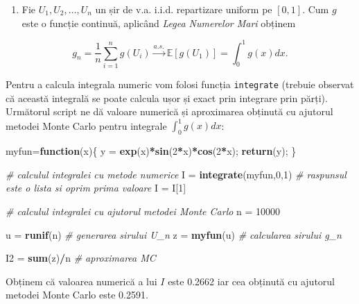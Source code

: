 \documentclass[]{article}
\newenvironment{Shaded}{\begin{snugshade}}{\end{snugshade}}
\newcommand{\CommentTok}[1]{\textcolor[rgb]{0.56,0.35,0.01}{\textit{#1}}}
\newcommand{\ControlFlowTok}[1]{\textcolor[rgb]{0.13,0.29,0.53}{\textbf{#1}}}
\newcommand{\DecValTok}[1]{\textcolor[rgb]{0.00,0.00,0.81}{#1}}
\newcommand{\KeywordTok}[1]{\textcolor[rgb]{0.13,0.29,0.53}{\textbf{#1}}}
\newcommand{\NormalTok}[1]{#1}
\newcommand{\OperatorTok}[1]{\textcolor[rgb]{0.81,0.36,0.00}{\textbf{#1}}}
\newcommand{\StringTok}[1]{\textcolor[rgb]{0.31,0.60,0.02}{#1}}
\providecommand{\tightlist}{%
  \setlength{\itemsep}{0pt}\setlength{\parskip}{0pt}}
\begin{document}
\begin{enumerate}
\def\labelenumi{\alph{enumi})}
\setcounter{enumi}{1}
\tightlist
\item
  Fie \(U_1,U_2,\dots,U_n\) un șir de v.a. i.i.d. repartizare uniform pe
  \([0,1]\). Cum \(g\) este o funcție continuă, aplicând \emph{Legea
  Numerelor Mari} obținem
\end{enumerate}

\[
  g_n=\frac{1}{n}\sum_{i=1}^{n}g(U_{i}) \overset{a.s.}{\to} \mathbb{E}[g(U_1)] = \int_{0}^{1}g(x)dx.
\]

Pentru a calcula integrala numeric vom folosi funcția \texttt{integrate}
(trebuie observat că această integrală se poate calcula ușor și exact
prin integrare prin părți). Următorul script ne dă valoare numerică și
aproximarea obținută cu ajutorul metodei Monte Carlo pentru integrale
\(\int_{0}^{1}g(x)dx\):

\begin{Shaded}
\begin{Highlighting}[]
\NormalTok{myfun=}\ControlFlowTok{function}\NormalTok{(x)\{}
\NormalTok{  y =}\StringTok{ }\KeywordTok{exp}\NormalTok{(x)}\OperatorTok{*}\KeywordTok{sin}\NormalTok{(}\DecValTok{2}\OperatorTok{*}\NormalTok{x)}\OperatorTok{*}\KeywordTok{cos}\NormalTok{(}\DecValTok{2}\OperatorTok{*}\NormalTok{x);}
  \KeywordTok{return}\NormalTok{(y);}
\NormalTok{\}}

\CommentTok{# calculul integralei cu metode numerice}
\NormalTok{I =}\StringTok{ }\KeywordTok{integrate}\NormalTok{(myfun,}\DecValTok{0}\NormalTok{,}\DecValTok{1}\NormalTok{) }\CommentTok{# raspunsul este o lista si oprim prima valoare}
\NormalTok{I =}\StringTok{ }\NormalTok{I[}\DecValTok{1}\NormalTok{]}

\CommentTok{# calculul integralei cu ajutorul metodei Monte Carlo}
\NormalTok{n =}\StringTok{ }\DecValTok{10000} 

\NormalTok{u =}\StringTok{ }\KeywordTok{runif}\NormalTok{(n) }\CommentTok{# generarea sirului U_n}
\NormalTok{z =}\StringTok{ }\KeywordTok{myfun}\NormalTok{(u) }\CommentTok{# calcularea sirului g_n}

\NormalTok{I2 =}\StringTok{ }\KeywordTok{sum}\NormalTok{(z)}\OperatorTok{/}\NormalTok{n }\CommentTok{# aproximarea MC}
\end{Highlighting}
\end{Shaded}

Obținem că valoarea numerică a lui \(I\) este 0.2662 iar cea obținută cu
ajutorul metodei Monte Carlo este 0.2591.
\end{document}
